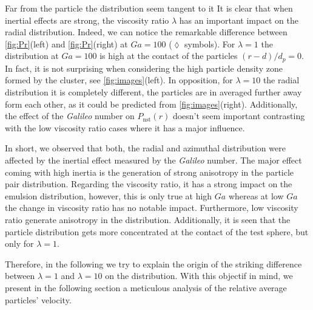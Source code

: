 Far from the particle the distribution seem tangent to it 
It is clear that when inertial effects are strong, the viscosity ratio $\lambda$ has an important impact on the radial distribution. 
Indeed, we can notice the remarkable difference between \ref{fig:Pr}(left) and  \ref{fig:Pr}(right) at $Ga = 100$ ($\lozenge$ symbols). 
For $\lambda = 1$ the distribution at $Ga = 100$ is high at the contact of the particles $(r-d)/d_p = 0$. 
In fact, it is not surprising when considering the high particle density zone formed by the cluster, see \ref{fig:images}(left). 
In opposition, for $\lambda  = 10$ the radial distribution it is completely different, the particles are in averaged further away form each other, as it could be predicted from \ref{fig:images}(right).
Additionally, the effect of the \textit{Galileo} number on $P_\text{nst}(r)$ doesn't seem important contrasting with the low viscosity ratio cases where it has a major influence.  

In short, we observed that both, the radial and azimuthal distribution were affected by the inertial effect measured by the \textit{Galileo} number. 
The major effect coming with high inertia is the generation of strong anisotropy in the particle pair distribution. 
Regarding the viscosity ratio, it has a strong impact on the emulsion distribution, however, this is only true at high $Ga$ whereas at low $Ga$ the change in viscosity ratio has no notable impact. 
Furthermore, low viscosity ratio generate anisotropy in the distribution.  
Additionally, it is seen that the particle distribution gets more concentrated at the contact of the test sphere, but only for $\lambda = 1$. 

Therefore, in the following we try to explain the origin of the striking difference between $\lambda = 1$ and $\lambda = 10$ on the distribution.
With this objectif in mind, we present in the following section a meticulous analysis of the relative average particles' velocity. 







